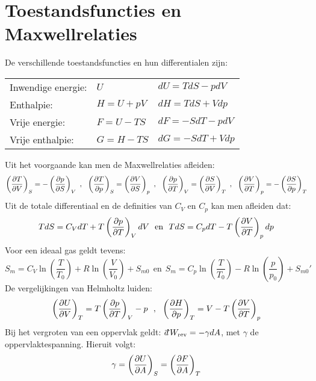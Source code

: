 \section{Toestandsfuncties en Maxwellrelaties}
De verschillende toestandsfuncties en hun differentialen zijn:
\begin{center}
\begin{tabular}{||l@{~~~~~~~}l@{~~~~~~~}l||}
\hline
Inwendige energie:&$U$     &$dU=TdS-pdV$\\
Enthalpie:        &$H=U+pV$&$dH=TdS+Vdp$\\
Vrije energie:    &$F=U-TS$&$dF=-SdT-pdV$\\
Vrije enthalpie:  &$G=H-TS$&$dG=-SdT+Vdp$\\
\hline
\end{tabular}
\end{center}
Uit het voorgaande kan men de Maxwellrelaties afleiden:
\[
\left(\frac{\partial T}{\partial V}\right)_{S}=-\left(\frac{\partial p}{\partial S}\right)_{V}~,~~\left(\frac{\partial T}{\partial p}\right)_{S}=\left(\frac{\partial V}{\partial S}\right)_{p}~,~~
\left(\frac{\partial p}{\partial T}\right)_{V}=\left(\frac{\partial S}{\partial V}\right)_{T}~,~~\left(\frac{\partial V}{\partial T}\right)_{p}=-\left(\frac{\partial S}{\partial p}\right)_{T}
\]
Uit de totale differentiaal en de definities van $C_V$ en $C_p$ kan men
afleiden dat:
\[
TdS=C_VdT+T\left(\frac{\partial p}{\partial T}\right)_{V}dV~~\mbox{en}~~TdS=C_pdT-T\left(\frac{\partial V}{\partial T}\right)_{p}dp
\]
Voor een ideaal gas geldt tevens:
\[
S_m=C_V\ln\left(\frac{T}{T_0}\right)+R\ln\left(\frac{V}{V_0}\right)+S_{m0}~~\mbox{en}~~
S_m=C_p\ln\left(\frac{T}{T_0}\right)-R\ln\left(\frac{p}{p_0}\right)+S_{m0}'
\]
De vergelijkingen van Helmholtz luiden:
\[
\left(\frac{\partial U}{\partial V}\right)_{T}=T\left(\frac{\partial p}{\partial T}\right)_{V}-p~~,~~\left(\frac{\partial H}{\partial p}\right)_{T}=V-T\left(\frac{\partial V}{\partial T}\right)_{p}
\]
Bij het vergroten van een oppervlak geldt: $\dd W_{\rm rev}=-\gamma dA$, met
$\gamma$ de oppervlaktespanning. Hieruit volgt:
\[
\gamma=\left(\frac{\partial U}{\partial A}\right)_{S}=\left(\frac{\partial F}{\partial A}\right)_{T}
\]

